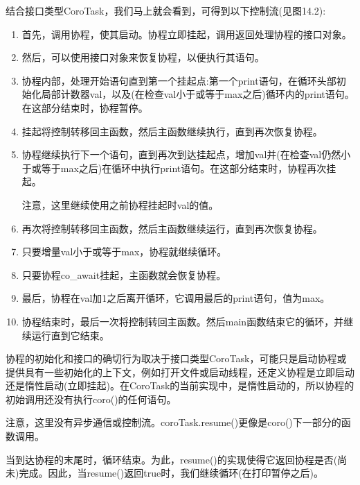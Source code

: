 结合接口类型CoroTask，我们马上就会看到，可得到以下控制流(见图14.2):

\begin{enumerate}[label=\alph*)]
\item 
首先，调用协程，使其启动。协程立即挂起，调用返回处理协程的接口对象。

\item 
然后，可以使用接口对象来恢复协程，以便执行其语句。

\item 
协程内部，处理开始语句直到第一个挂起点:第一个print语句，在循环头部初始化局部计数器val，以及(在检查val小于或等于max之后)循环内的print语句。在这部分结束时，协程暂停。

\item 
挂起将控制转移回主函数，然后主函数继续执行，直到再次恢复协程。

\item 
协程继续执行下一个语句，直到再次到达挂起点，增加val并(在检查val仍然小于或等于max之后)在循环中执行print语句。在这部分结束时，协程再次挂起。

注意，这里继续使用之前协程挂起时val的值。

\item 
再次将控制转移回主函数，然后主函数继续运行，直到再次恢复协程。

\item 
只要增量val小于或等于max，协程就继续循环。

\item 
只要协程co\_await挂起，主函数就会恢复协程。

\item 
最后，协程在val加1之后离开循环，它调用最后的print语句，值为max。

\item 
协程结束时，最后一次将控制转回主函数。然后main函数结束它的循环，并继续运行直到它结束。
\end{enumerate}

协程的初始化和接口的确切行为取决于接口类型CoroTask，可能只是启动协程或提供具有一些初始化的上下文，例如打开文件或启动线程，还定义协程是立即启动还是惰性启动(立即挂起)。在CoroTask的当前实现中，是惰性启动的，所以协程的初始调用还没有执行coro()的任何语句。

注意，这里没有异步通信或控制流。coroTask.resume()更像是coro()下一部分的函数调用。

当到达协程的末尾时，循环结束。为此，resume()的实现使得它返回协程是否(尚未)完成。因此，当resume()返回true时，我们继续循环(在打印暂停之后)。


